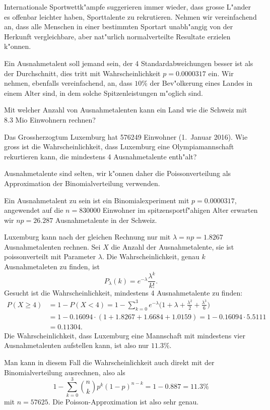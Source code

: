 Internationale Sportwettk"ampfe suggerieren immer wieder, dass grosse
L"ander es offenbar leichter haben, Sporttalente zu rekrutieren.
Nehmen wir vereinfachend an, dass alle Menschen in einer
bestimmten Sportart unabh"angig von der Herkunft vergleichbare,
aber nat"urlich normalverteilte Resultate erzielen k"onnen.

Ein Ausnahmetalent soll jemand sein, der 4 Standardabweichungen besser ist
als der Durchschnitt, dies tritt mit Wahrscheinlichkeit $p = 0.0000317$ ein.
Wir nehmen, ebenfalls vereinfachend, an, dass $10\%$ der Bev"olkerung
eines Landes in einem Alter sind, in dem solche Spitzenleistungen
m"oglich sind.
\begin{teilaufgaben}
\item
Mit welcher Anzahl von Ausnahmetalenten kann ein Land wie die Schweiz mit 
8.3 Mio Einwohnern rechnen?
\item
Das Grossherzogtum Luxemburg hat 576249 Einwohner (1.~Januar 2016).
Wie gross ist die Wahrscheinlichkeit, dass Luxemburg eine Olympiamannschaft
rekurtieren kann, die mindestens 4 Ausnahmetalente enth"alt?
\end{teilaufgaben}

\begin{loesung}
Ausnahmetalente sind selten, wir k"onnen daher die Poissonverteilung als
Approximation der Binomialverteilung verwenden.
\begin{teilaufgaben}
\item
Ein Ausnahmetalent zu sein ist ein Binomialexperiment mit $p=0.0000317$,
angewendet auf die $n=830000$ Einwohner im spitzensportf"ahigen Alter
erwarten wir $np=26.287$ Ausnahmetalente in der Schweiz.
\item
Luxemburg kann nach der gleichen Rechnung nur mit $\lambda=np=1.8267$
Ausnahmetalenten rechnen.
Sei $X$ die Anzahl der Ausnahmetalente, sie ist poissonverteilt mit
Parameter $\lambda$.
Die Wahrscheinlichkeit, genau $k$ Ausnahmetaleten zu finden, ist
\[
P_\lambda(k)=e^{-\lambda}\frac{\lambda^k}{k!}.
\]
Gesucht ist die Wahrscheinlichkeit, mindestens 4 Ausnahmetalente zu finden:
\begin{align*}
P(X \ge 4)
&=
1-P(X<4)=1-\sum_{k=0}^3 e^{-\lambda}\biggl(
1+\lambda+ \frac{\lambda^2}{2} + \frac{\lambda^3}{6}
\biggr)
\\
&=
1-0.16094\cdot(1+1.8267+1.6684+1.0159)
=
1-0.16094\cdot 5.5111\\
&=
0.11304.
\end{align*}
Die Wahrscheinlichkeit, dass Luxemburg eine Mannschaft mit mindestens
vier Ausnahmetalenten aufstellen kann, ist also nur $11.3\%$.

Man kann in diesem Fall die Wahrscheinlichkeit auch direkt mit der
Binomialverteilung ausrechnen, also als
\[
1-\sum_{k=0}^3\binom{n}{k}p^k(1-p)^{n-k}
=
1-0.887 = 11.3\%
\]
mit $n=57625$.
Die Poisson-Approximation ist also sehr genau.
\qedhere
\end{teilaufgaben}
\end{loesung}

